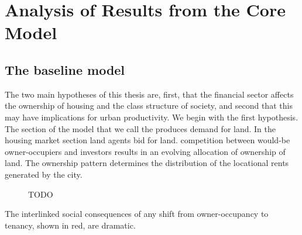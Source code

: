 \chapter{Analysis of Results from the Core Model} \label{chapter-analysis}


\section{The baseline model} 
The two main hypotheses of this thesis are, first,  that the financial sector affects the ownership of housing and the class structure of society, and second that this may have implications for urban productivity. We begin with the first hypothesis. The section of the model that we call the produces demand for land. In the housing market section land agents bid for land. competition between would-be owner-occupiers and investors results in an evolving allocation of ownership of land. The ownership pattern determines the distribution of the locational rents generated by the city.

\begin{figure}
\centering
{}
\caption{TODO}
\label{fig:enter-label}
\end{figure}


The interlinked social consequences of any shift from owner-occupancy to tenancy, shown in red, are dramatic. 


